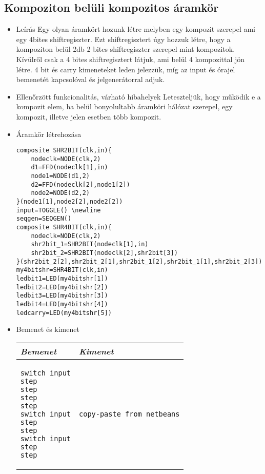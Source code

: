 \subsection{Kompoziton belüli kompozitos áramkör}
\begin{itemize}
\item Leírás\newline
Egy olyan áramkört hozunk létre melyben egy kompozit szerepel ami egy 4bites shiftregiszter. Ezt shiftregisztert úgy hozzuk létre, hogy a kompoziton belül 2db 2 bites shiftregiszter szerepel mint kompozitok. Kívülről csak a 4 bites shiftregisztert látjuk, ami belül 4 kompozittal jön létre. 4 bit és carry kimeneteket leden jelezzük, míg az input és órajel bemenetét kapcsolóval és jelgenerátorral adjuk.
\item Ellenőrzött funkcionalitás, várható hibahelyek\newline
Leteszteljük, hogy működik e a kompozit elem, ha belül bonyolultabb áramköri hálózat szerepel, egy kompozit, illetve jelen esetben több kompozit.

\item Áramkör létrehozása

\begin{verbatim}
composite SHR2BIT(clk,in){		
    nodeclk=NODE(clk,2)		
    d1=FFD(nodeclk[1],in)		
    node1=NODE(d1,2)			
    d2=FFD(nodeclk[2],node1[2])
    node2=NODE(d2,2)			
}(node1[1],node2[2],node2[2])
input=TOGGLE() \newline
seqgen=SEQGEN()
composite SHR4BIT(clk,in){		
    nodeclk=NODE(clk,2)		
    shr2bit_1=SHR2BIT(nodeclk[1],in)
    shr2bit_2=SHR2BIT(nodeclk[2],shr2bit[3])			
}(shr2bit_2[2],shr2bit_2[1],shr2bit_1[2],shr2bit_1[1],shr2bit_2[3])
my4bitshr=SHR4BIT(clk,in)
ledbit1=LED(my4bitshr[1])
ledbit2=LED(my4bitshr[2])
ledbit3=LED(my4bitshr[3])
ledbit4=LED(my4bitshr[4])
ledcarry=LED(my4bitshr[5])
\end{verbatim}

\item Bemenet és kimenet\newline

\begin{tabular}{|p{5cm}|p{5cm}|} 
\hline 
\textit{Bemenet} & \textit{Kimenet} \\ \hline
\begin{verbatim}
switch input
step
step
step
step
switch input
step
step
switch input
step
step
\end{verbatim}
& 
\begin{verbatim}
copy-paste from netbeans
\end{verbatim}
\\ \hline
\end{tabular}

\end{itemize}


